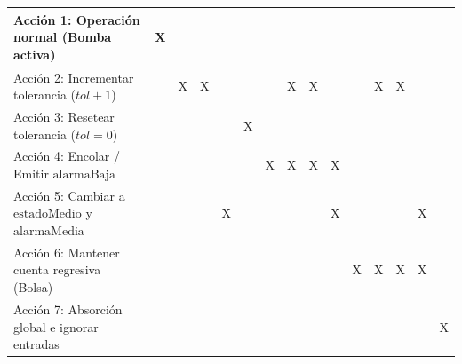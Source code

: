 \begin{table}[htbp]
\begin{tabular}{|l|*{14}{c|}}
Acción 1: Operación normal (Bomba activa)      & X &   &   &   &   &   &   &   &   &   &   &   &   &   \\ \hline
Acción 2: Incrementar tolerancia ($tol + 1$)   &   & X & X &   &   &   & X & X &   &   & X & X &   &   \\ \hline
Acción 3: Resetear tolerancia ($tol = 0$)       &   &   &   &   & X &   &   &   &   &   &   &   &   &   \\ \hline
Acción 4: Encolar / Emitir $\mathrm{alarmaBaja}$    &   &   &   &   &   & X & X & X & X &   &   &   &   &   \\ \hline
Acción 5: Cambiar a $\mathrm{estadoMedio}$ y $\mathrm{alarmaMedia}$ &   &   &   & X &   &   &   &   & X &   &   &   & X &   \\ \hline
Acción 6: Mantener cuenta regresiva (Bolsa)    &   &   &   &   &   &   &   &   &   & X & X & X & X &   \\ \hline
Acción 7: Absorción global e ignorar entradas  &   &   &   &   &   &   &   &   &   &   &   &   &   & X \\ \hline
\end{tabular}
\end{table}